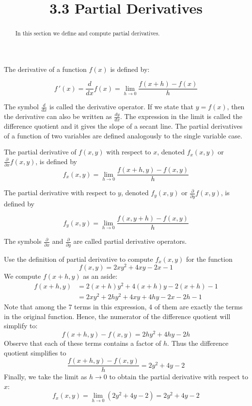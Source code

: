 \documentclass[handout]{ximera}
\title{3.3 Partial Derivatives}
\begin{document}
\begin{abstract}
In this section we define and compute partial derivatives.
\end{abstract}

\maketitle

The derivative of a function $f(x)$ is defined by:

\[
f\,'(x) =  \frac{d}{dx} f(x) = \lim_{h \to 0} \frac{f(x+h) -f(x)}{h}
\]

The symbol $\frac{d}{dx}$ is called the derivative operator. If we state that $y = f(x)$, then the derivative can also be written as $\frac{dy}{dx}$.
The expression in the limit is called the difference quotient and it gives the slope of a secant line.
The partial derivatives of a function of two variables are defined analogously to the single variable case.

\begin{definition}
The partial derivative of $f(x,y)$ with respect to $x$, denoted $f_x(x,y)$ or $\frac{\partial}{\partial x} f(x,y)$, is defined by
\[
f_x(x,y)= \lim_{h \to 0} \frac{f(x+h, y) -f(x, y)}{h}
\]

The partial derivative with respect to $y$, denoted $f_y(x,y)$ or $\frac{\partial}{\partial y} f(x,y)$, is defined by


\[
f_y(x,y) = \lim_{h \to 0} \frac{f(x, y+h) -f(x, y)}{h}
\]

The symbols $\frac{\partial}{\partial x}$ and $\frac{\partial}{\partial y}$ are called partial derivative operators.

\end{definition}



\begin{example}[Example 1]
Use the definition of partial derivative to compute $f_x(x,y)$ for the function
\[
f(x,y) = 2xy^2 + 4xy - 2x -1
\]
We compute $f(x+h, y)$ as an aside:
\begin{align*}
f(x+h, y) &= 2(x+h)y^2 + 4(x+h)y - 2(x+h)  -1\\
          &= 2xy^2 + 2hy^2 + 4xy + 4hy - 2x - 2h - 1
\end{align*}
Note that among the 7 terms in this expression, 4 of them are exactly the terms in the original function.
Hence, the numerator of the difference quotient will simplify to:
\[
f(x+h, y) - f(x,y) =  2hy^2 + 4hy - 2h
\]
Observe that each of these terms contains a factor of $h$. Thus the difference quotient simplifies to
\[
\frac{f(x+h, y) -f(x, y)}{h} = 2y^2 + 4y - 2
\]
Finally, we take the limit as $h \to 0$ to obtain the partial derivative with respect to $x$:
\[
f_x(x,y) = \lim_{h \to 0} \left(2y^2 + 4y - 2\right) = 2y^2 + 4y - 2
\]

\end{example}
\end{document}

